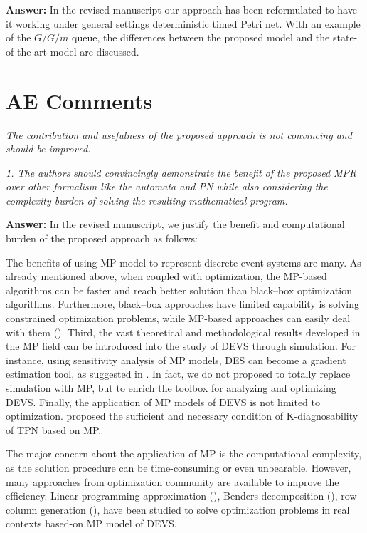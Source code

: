 \documentclass[suppldata]{interact}
\begin{document}
\noindent
\textbf{Answer:} %
In the revised manuscript our approach %
has been reformulated to have it working under general settings deterministic timed Petri net. With an example of the $G/G/m$ queue, the differences between the proposed model and the state-of-the-art model are discussed.


\section{AE Comments}
\textit{The contribution and usefulness of the proposed approach is not convincing and should be improved. }

\textit{1. The authors should convincingly demonstrate the benefit of the proposed MPR over other formalism like the automata and PN while also considering the complexity burden of solving the resulting mathematical program. }

\noindent
\textbf{Answer:} %
In the revised manuscript, we justify the benefit and computational burden of the proposed approach as follows: 

The benefits of using MP model to represent discrete event systems are many. As already mentioned above, when coupled with optimization, the MP-based algorithms can be faster and %
reach better solution than black--box optimization algorithms. Furthermore, black--box approaches have limited capability is solving constrained optimization problems, %
while MP-based approaches can easily deal with them (\cite{zhang2020models}). Third, the vast theoretical and methodological results developed in the MP field can be introduced into the study of DEVS through simulation. For instance, using sensitivity analysis of MP models, DES can %
become a gradient estimation tool, as suggested in \cite{chan2008optimization}. In fact, we do not proposed to totally replace simulation with MP, but to enrich the toolbox for analyzing and optimizing DEVS. Finally, the application of MP models of DEVS is not limited to optimization. \cite{basile2012k} proposed the sufficient and necessary condition of K-diagnosability of TPN based on MP. 


The major concern about the application of MP is the computational complexity, %
as the solution procedure can be time-consuming or even unbearable. However, many approaches from optimization community are available to improve the efficiency. Linear programming approximation (\cite{alfieri2012mathematical}), Benders decomposition (\cite{weiss2015buffer}), row-column generation (\cite{alfieri2020time}), have been studied to solve optimization problems in %
real contexts based-on MP model of DEVS.
\end{document}
